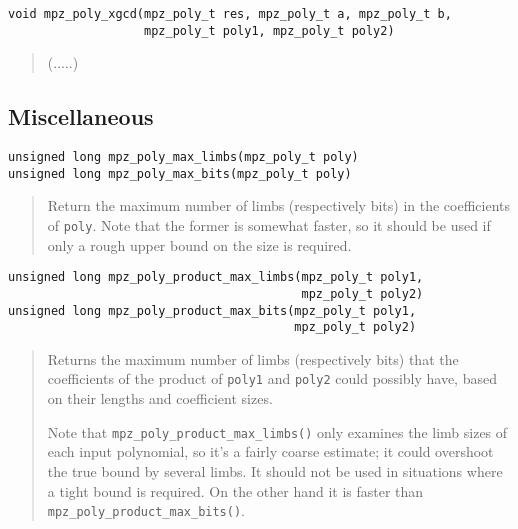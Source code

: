 \documentclass[a4paper,10pt]{article}
\newcommand{\code}{\lstinline}
\begin{document}
\begin{lstlisting}
void mpz_poly_xgcd(mpz_poly_t res, mpz_poly_t a, mpz_poly_t b,
                   mpz_poly_t poly1, mpz_poly_t poly2)
\end{lstlisting}
\begin{quote}
(.....)
\end{quote}


\subsection{Miscellaneous}

\begin{lstlisting}
unsigned long mpz_poly_max_limbs(mpz_poly_t poly)
unsigned long mpz_poly_max_bits(mpz_poly_t poly)
\end{lstlisting}
\begin{quote}
Return the maximum number of limbs (respectively bits) in the coefficients of \code{poly}. Note that the former is somewhat faster, so it should be used if only a rough upper bound on the size is required.
\end{quote}


\begin{lstlisting}
unsigned long mpz_poly_product_max_limbs(mpz_poly_t poly1,
                                         mpz_poly_t poly2)
unsigned long mpz_poly_product_max_bits(mpz_poly_t poly1,
                                        mpz_poly_t poly2)
\end{lstlisting}
\begin{quote}
Returns the maximum number of limbs (respectively bits) that the coefficients of the product of \code{poly1} and \code{poly2} could possibly have, based on their lengths and coefficient sizes.

Note that \code{mpz_poly_product_max_limbs()} only examines the limb sizes of each input polynomial, so it's a fairly coarse estimate; it could overshoot the true bound by several limbs. It should not be used in situations where a tight bound is required. On the other hand it is faster than \code{mpz_poly_product_max_bits()}.
\end{quote}





\end{document}
